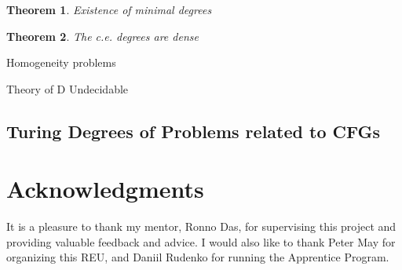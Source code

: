 \documentclass[psamsfonts]{amsart}
\newtheorem{thm}{Theorem}[section]
\theoremstyle{definition}
\theoremstyle{remark}
\numberwithin{equation}{section}
\begin{document}
\begin{thm}
  Existence of minimal degrees
  \cite{spector56_degrees_recur_unsol}
  \cite{shoenfield66_theor_minim_degrees}
\end{thm}

\begin{thm}
  The c.e. degrees are dense
  \cite{sacks64:_recur_enumer_degrees_dense}
\end{thm}

Homogeneity problems

Theory of D Undecidable

\subsection{Turing Degrees of Problems related to CFGs}
\cite{REEDY197577}




\section*{Acknowledgments}
It is a pleasure to thank my mentor, Ronno Das, for supervising this project and
providing valuable feedback and advice. I would also like to thank Peter May for
organizing this REU, and Daniil Rudenko for running the Apprentice Program.

\printbibliography
\end{document}

